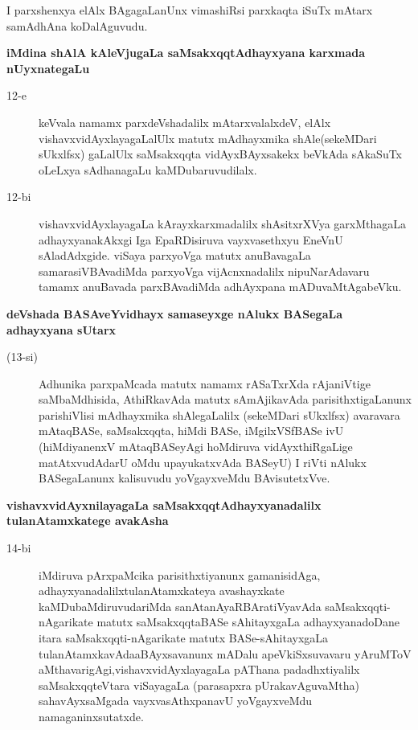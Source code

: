 I parxshenxya elAlx BAgagaLanUnx vimashiRsi parxkaqta iSuTx mAtarx samAdhAna koDalAguvudu.

\newpage

{\bigskip
\noindent
{\large\bf iMdina shAlA kAleVjugaLa saMsakxqqtAdhayxyana karxmada nUyxnategaLu}}\label{page43}
\begin{description}
\item[12-e] keVvala namamx parxdeVshadalilx mAtarxvalalxdeV, elAlx vishavxvidAyxlayagaLalUlx matutx mAdhayxmika shAle\-(sekeM\-Dari sUkxlfsx) gaLalUlx saMsakxqqta vidAyxBAyxsakekx beVkAda sAkaSuTx oLeLxya sAdhanagaLu kaMDu\-baruvu\-dilalx.

\item[12-bi] vishavxvidAyxlayagaLa kArayxkarxmadalilx shAsitxrXVya garxMthagaLa adhayxyanakAkxgi Iga EpaRDisiruva \-vayxva\-sethxyu EneVnU sAladAdxgide. viSaya parxyoVga matutx anuBavagaLa samarasiVBAvadiMda parx\-yoVga vijAcnxnadalilx nipuNarAdavaru tamamx anuBavada parxBAvadiMda adhAyxpana mADu\-vaMtAga\-beVku.
\end{description}

{\medskip
\noindent
{\large\bf deVshada BASAveYvidhayx samaseyxge nAlukx BASegaLa adhayxyana sUtarx}}\label{page44}

\begin{description}
\item[(13-si)] Adhunika parxpaMcada matutx namamx rASaTxrXda rAjaniVtige saMbaMdhisida, AthiRkavAda matutx sAmAjika\-vAda parisithxtigaLanunx parishiVlisi mAdhayxmika shAlegaLalilx (sekeMDari sUkxlfsx) avaravara mAtaq\-BASe, saMsakxqqta, hiMdi BASe, iMgilxVSfBASe ivU (hiMdiyanenxV mAtaqBASeyAgi hoMdiruva vidAyx\-thiRgaLige matAtxvudAdarU oMdu upayukatxvAda BASeyU) I riVti nAlukx BASegaLanunx kalisuvudu yoVgayxveMdu BAvisutetxVve.
\end{description}

{\medskip
\noindent
{\large\bf vishavxvidAyxnilayagaLa saMsakxqqtAdhayxyanadalilx tulanAtamxkatege avakAsha}}\label{page44}

\begin{description}
\item[14-bi] iMdiruva pArxpaMcika parisithxtiyanunx gamanisidAga, adhayxyanadalilx\break tulanA\-tamxkateya avashayx\-kate kaMDubaMdiruvudariMda sanAtanAyaRBAra\-tiVyavAda saMsakxqqti-nAgarikate matutx saMsakxqqtaBASe sAhitayxgaLa adhayxyana\-doDane itara saMsakxqqti-nAgarikate matutx BASe-sAhitayxgaLa tulanAtamxka\-vAda\break aBAyxsavanunx mADalu apeVkiSxsuvavaru yAruMToV aMthavarigAgi,\break vishavxvidAyxlayagaLa pAThana padadhxtiyalilx saMsakxqqteVtara viSayagaLa (parasapxra pUrakavAguvaMtha) sahavAyxsaMgada vayxvasAthxpa\-navU yoVgayxveMdu namaganinxsutatxde.
\end{description}


